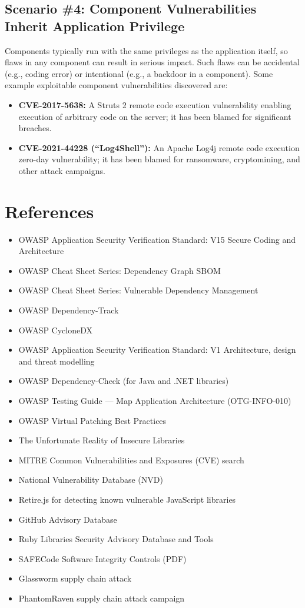 \documentclass[11pt]{article}
\begin{document}
\subsection{Scenario \#4: Component Vulnerabilities Inherit Application Privilege}
Components typically run with the same privileges as the application itself, so flaws in any component can result in serious impact. Such flaws can be accidental (e.g., coding error) or intentional (e.g., a backdoor in a component). Some example exploitable component vulnerabilities discovered are:

\begin{itemize}
  \item \textbf{CVE-2017-5638:} A Struts 2 remote code execution vulnerability enabling execution of arbitrary code on the server; it has been blamed for significant breaches.
  \item \textbf{CVE-2021-44228 (``Log4Shell''):} An Apache Log4j remote code execution zero-day vulnerability; it has been blamed for ransomware, cryptomining, and other attack campaigns.
\end{itemize}

\section{References}
\begin{itemize}
  \item OWASP Application Security Verification Standard: V15 Secure Coding and Architecture
  \item OWASP Cheat Sheet Series: Dependency Graph SBOM
  \item OWASP Cheat Sheet Series: Vulnerable Dependency Management
  \item OWASP Dependency-Track
  \item OWASP CycloneDX
  \item OWASP Application Security Verification Standard: V1 Architecture, design and threat modelling
  \item OWASP Dependency-Check (for Java and .NET libraries)
  \item OWASP Testing Guide --- Map Application Architecture (OTG-INFO-010)
  \item OWASP Virtual Patching Best Practices
  \item The Unfortunate Reality of Insecure Libraries
  \item MITRE Common Vulnerabilities and Exposures (CVE) search
  \item National Vulnerability Database (NVD)
  \item Retire.js for detecting known vulnerable JavaScript libraries
  \item GitHub Advisory Database
  \item Ruby Libraries Security Advisory Database and Tools
  \item SAFECode Software Integrity Controls (PDF)
  \item Glassworm supply chain attack
  \item PhantomRaven supply chain attack campaign
\end{itemize}
\end{document}
